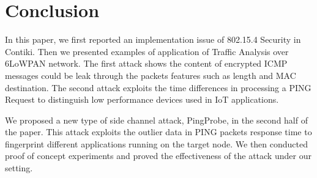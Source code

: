 \section{Conclusion \label{conclusion}}

In this paper, we first reported an implementation issue of 802.15.4 Security in Contiki. Then we presented examples of application of Traffic Analysis over 6LoWPAN network. The first attack shows the content of encrypted ICMP messages could be leak through the packets features such as length and MAC destination. The second attack exploits the time differences in processing a PING Request to distinguish low performance devices used in IoT applications.

We proposed a new type of side channel attack, PingProbe, in the second half of the paper. This attack exploits the outlier data in PING packets response time to fingerprint different applications running on the target node. We then conducted proof of concept experiments and proved the effectiveness of the attack under our setting.